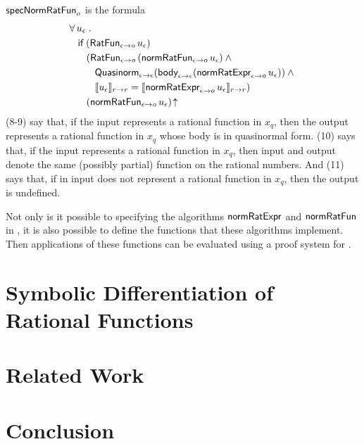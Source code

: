 \documentclass[fleqn]{llncs}
\begin{document}
$\mbox{\sf specNormRatFun}_o$ is the formula
\begin{align}
&
\forall\, u_\epsilon \mathrel.\\
& \hspace*{2ex}
\mbox{\sf if} \; (\mbox{\sf RatFun}_{\epsilon \rightarrow o} \, u_\epsilon)\\
& \hspace*{4ex}
(\mbox{\sf RatFun}_{\epsilon \rightarrow o} \, (\mbox{\sf normRatFun}_{\epsilon \rightarrow o} \, u_\epsilon) \wedge {}\\
& \hspace*{6ex}
\mbox{\sf Quasinorm}_{\epsilon \rightarrow \epsilon}(\mbox{\sf body}_{\epsilon \rightarrow \epsilon}(\mbox{\sf normRatExpr}_{\epsilon \rightarrow o} \, u_\epsilon)) \wedge {}\\
& \hspace*{6ex}
\llbracket u_\epsilon\rrbracket_{r \rightarrow r} =
\llbracket\mbox{\sf normRatExpr}_{\epsilon \rightarrow o} \, u_\epsilon\rrbracket_{r \rightarrow r})\\
& \hspace*{4ex}
(\mbox{\sf normRatFun}_{\epsilon \rightarrow o} \, u_\epsilon)\!\uparrow
\end{align}
(8-9) say that, if the input represents a rational function in $x_q$,
then the output represents a rational function in $x_q$ whose body is
in quasinormal form.  (10) says that, if the input represents a
rational function in $x_q$, then input and output denote the same
(possibly partial) function on the rational numbers.  And (11) says
that, if in input does not represent a rational function in $x_q$,
then the output is undefined.

Not only is it possible to specifying the algorithms
$\mbox{\sf normRatExpr}$ and $\mbox{\sf normRatFun}$ in {\churchuqe}, it is
also possible to define the functions that these algorithms implement.
Then applications of these functions can be evaluated using a proof
system for {\churchuqe}.

\section{Symbolic Differentiation of Rational Functions}


\section{Related Work}

\section{Conclusion}




\setcounter{tocdepth}{1}
\listoftodos
\setcounter{tocdepth}{0}
\end{document}
